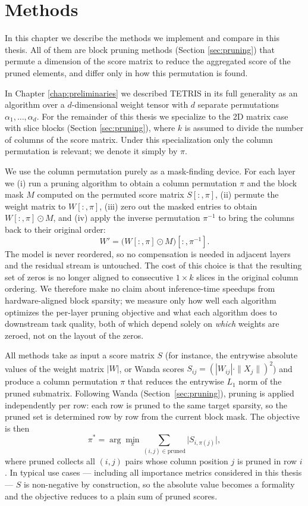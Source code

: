 \chapter{Methods}
\label{chap:methods}

In this chapter we describe the methods we implement and compare in this thesis. All of them are block pruning methods (Section \ref{sec:pruning}) that permute a dimension of the score matrix to reduce the aggregated score of the pruned elements, and differ only in how this permutation is found.

In Chapter \ref{chap:preliminaries} we described TETRIS in its full generality as an algorithm over a $d$-dimensional weight tensor with $d$ separate permutations $\alpha_1, \ldots, \alpha_d$. For the remainder of this thesis we specialize to the 2D matrix case with slice blocks (Section \ref{sec:pruning}), where $k$ is assumed to divide the number of columns of the score matrix. Under this specialization only the column permutation is relevant; we denote it simply by $\pi$.

We use the column permutation purely as a mask-finding device. For each layer we (i) run a pruning algorithm to obtain a column permutation $\pi$ and the block mask $M$ computed on the permuted score matrix $S[:, \pi]$, (ii) permute the weight matrix to $W[:, \pi]$, (iii) zero out the masked entries to obtain $W[:, \pi] \odot M$, and (iv) apply the inverse permutation $\pi^{-1}$ to bring the columns back to their original order:
$$ W' = \bigl(W[:, \pi] \odot M\bigr)[:, \pi^{-1}]. $$
The model is never reordered, so no compensation is needed in adjacent layers and the residual stream is untouched. The cost of this choice is that the resulting set of zeros is no longer aligned to consecutive $1 \times k$ slices in the original column ordering. We therefore make no claim about inference-time speedups from hardware-aligned block sparsity; we measure only how well each algorithm optimizes the per-layer pruning objective and what each algorithm does to downstream task quality, both of which depend solely on \emph{which} weights are zeroed, not on the layout of the zeros.

All methods take as input a score matrix $S$ (for instance, the entrywise absolute values of the weight matrix $|W|$, or Wanda scores $S_{ij} = (|W_{ij}| \cdot \|X_j\|)^2$) and produce a column permutation $\pi$ that reduces the entrywise $L_1$ norm of the pruned submatrix. Following Wanda (Section~\ref{sec:pruning}), pruning is applied independently per row: each row is pruned to the same target sparsity, so the pruned set is determined row by row from the current block mask. The objective is then
$$ \pi^* = \arg\min_{\pi} \sum_{(i,j) \in \mathrm{pruned}} \big|S_{i,\pi(j)}\big|, $$
where $\mathrm{pruned}$ collects all $(i, j)$ pairs whose column position $j$ is pruned in row $i$. In typical use cases --- including all importance metrics considered in this thesis --- $S$ is non-negative by construction, so the absolute value becomes a formality and the objective reduces to a plain sum of pruned scores.

